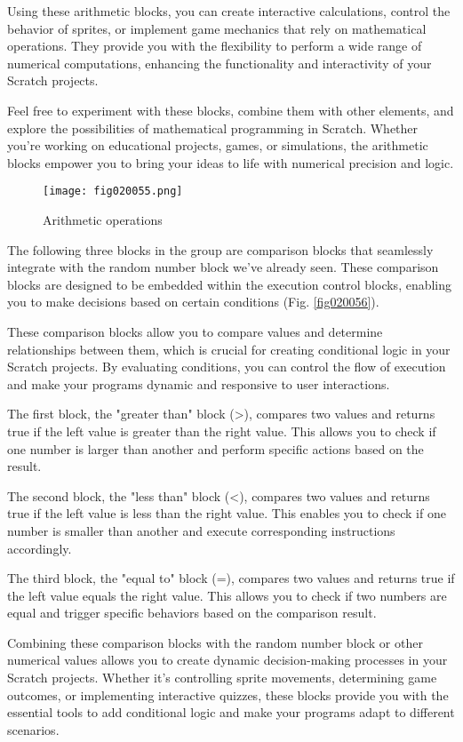 Using these arithmetic blocks, you can create interactive calculations, control the behavior of sprites, or implement game mechanics that rely on mathematical operations. They provide you with the flexibility to perform a wide range of numerical computations, enhancing the functionality and interactivity of your Scratch projects.

Feel free to experiment with these blocks, combine them with other elements, and explore the possibilities of mathematical programming in Scratch. Whether you're working on educational projects, games, or simulations, the arithmetic blocks empower you to bring your ideas to life with numerical precision and logic.

\begin{figure}[H]
   \centering
   \texttt{[image: fig020055.png]}
   \caption{Arithmetic operations}
\label{fig020055}
\end{figure}

The following three blocks in the group are comparison blocks that seamlessly integrate with the random number block we've already seen. These comparison blocks are designed to be embedded within the execution control blocks, enabling you to make decisions based on certain conditions (Fig. \ref{fig020056}).

These comparison blocks allow you to compare values and determine relationships between them, which is crucial for creating conditional logic in your Scratch projects. By evaluating conditions, you can control the flow of execution and make your programs dynamic and responsive to user interactions.

The first block, the "greater than" block (>), compares two values and returns true if the left value is greater than the right value. This allows you to check if one number is larger than another and perform specific actions based on the result.

The second block, the "less than" block (<), compares two values and returns true if the left value is less than the right value. This enables you to check if one number is smaller than another and execute corresponding instructions accordingly.

The third block, the "equal to" block (=), compares two values and returns true if the left value equals the right value. This allows you to check if two numbers are equal and trigger specific behaviors based on the comparison result.

Combining these comparison blocks with the random number block or other numerical values allows you to create dynamic decision-making processes in your Scratch projects. Whether it's controlling sprite movements, determining game outcomes, or implementing interactive quizzes, these blocks provide you with the essential tools to add conditional logic and make your programs adapt to different scenarios.

